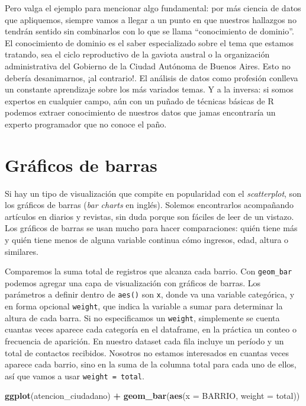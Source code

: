 \documentclass[spanish,]{book}
\newenvironment{Shaded}{\begin{snugshade}}{\end{snugshade}}
\newcommand{\DataTypeTok}[1]{\textcolor[rgb]{0.13,0.29,0.53}{#1}}
\newcommand{\KeywordTok}[1]{\textcolor[rgb]{0.13,0.29,0.53}{\textbf{#1}}}
\newcommand{\NormalTok}[1]{#1}
\newcommand{\OperatorTok}[1]{\textcolor[rgb]{0.81,0.36,0.00}{\textbf{#1}}}
\newcommand{\StringTok}[1]{\textcolor[rgb]{0.31,0.60,0.02}{#1}}
\begin{document}
Pero valga el ejemplo para mencionar algo fundamental: por más ciencia de datos que apliquemos, siempre vamos a llegar a un punto en que nuestros hallazgos no tendrán sentido sin combinarlos con lo que se llama ``conocimiento de dominio''. El conocimiento de dominio es el saber especializado sobre el tema que estamos tratando, sea el ciclo reproductivo de la gaviota austral o la organización administrativa del Gobierno de la Ciudad Autónoma de Buenos Aires. Esto no debería desanimarnos, ¡al contrario!. El análisis de datos como profesión conlleva un constante aprendizaje sobre los más variados temas. Y a la inversa: si somos expertos en cualquier campo, aún con un puñado de técnicas básicas de R podemos extraer conocimiento de nuestros datos que jamas encontraría un experto programador que no conoce el paño.

\hypertarget{gruxe1ficos-de-barras}{%
\section{Gráficos de barras}\label{gruxe1ficos-de-barras}}

Si hay un tipo de visualización que compite en popularidad con el \emph{scatterplot}, son los gráficos de barras (\emph{bar charts} en inglés). Solemos encontrarlos acompañando artículos en diarios y revistas, sin duda porque son fáciles de leer de un vistazo. Los gráficos de barras se usan mucho para hacer comparaciones: quién tiene más y quién tiene menos de alguna variable continua cómo ingresos, edad, altura o similares.

Comparemos la suma total de registros que alcanza cada barrio. Con \texttt{geom\_bar} podemos agregar una capa de visualización con gráficos de barras. Los parámetros a definir dentro de \texttt{aes()} son \texttt{x}, donde va una variable categórica, y en forma opcional \texttt{weight}, que indica la variable a sumar para determinar la altura de cada barra. Si no especificamos un \texttt{weight}, simplemente se cuenta cuantas veces aparece cada categoría en el dataframe, en la práctica un conteo o frecuencia de aparición. En nuestro dataset cada fila incluye un período y un total de contactos recibidos. Nosotros no estamos interesados en cuantas veces aparece cada barrio, sino en la suma de la columna total para cada uno de ellos, así que vamos a usar \texttt{weight\ =\ total}.

\begin{Shaded}
\begin{Highlighting}[]
\KeywordTok{ggplot}\NormalTok{(atencion_ciudadano) }\OperatorTok{+}
\StringTok{    }\KeywordTok{geom_bar}\NormalTok{(}\KeywordTok{aes}\NormalTok{(}\DataTypeTok{x =}\NormalTok{ BARRIO, }\DataTypeTok{weight =}\NormalTok{ total))}
\end{Highlighting}
\end{Shaded}
\end{document}

